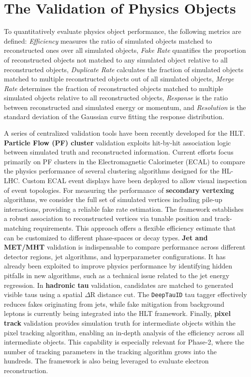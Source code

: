 \documentclass[a4paper,11pt]{article}
\begin{document}
\section{The Validation of Physics Objects}
\label{sec:valid}
To quantitatively evaluate physics object performance, the following metrics are defined:
\textit{Efficiency} measures the ratio of simulated objects matched to reconstructed ones over all simulated objects,
\textit{Fake Rate} quantifies the proportion of reconstructed objects not matched to any simulated object relative to all reconstructed objects,
\textit{Duplicate Rate} calculates the fraction of simulated objects matched to multiple reconstructed objects out of all simulated objects,
\textit{Merge Rate} determines the fraction of reconstructed objects matched to multiple simulated objects relative to all reconstructed objects,
\textit{Response} is the ratio between reconstructed and simulated energy or momentum, and
\textit{Resolution} is the standard deviation of the Gaussian curve fitting the response distribution. \par
%
A series of centralized validation tools have been recently developed for the HLT. 
\textbf{Particle Flow (PF) cluster} validation exploits hit-by-hit association logic between simulated truth and reconstructed information.
Current efforts focus primarily on PF clusters in the Electromagnetic Calorimeter (ECAL) to compare the physics performance of several clustering algorithms designed for the HL-LHC.
Custom ECAL event displays have been deployed to allow visual inspection of event topologies.
%
For measuring the performance of \textbf{secondary vertexing} algorithms, we consider the full set of simulated vertices including pile-up interactions, providing a reliable fake rate estimation.
The framework establishes a robust association to reconstructed vertices via tunable position and track-matching requirements.
This approach offers a flexible efficiency estimate that can be customized to different phase-spaces or decay types.
%
\textbf{Jet and MET/MHT} validation is indispensable to compare performance across different detector regions, jet algorithms, and hyperparameter configurations.
It has already been exploited to improve physics performance by identifying hidden pitfalls in new algorithms, such as a technical issue related to the jet energy regression.
%
In \textbf{hadronic tau} validation, candidates are matched to generated visible taus using a spatial $\Delta \text{R}$ distance cut.
The \texttt{DeepTauID} tau tagger effectively reduces fakes originating from jets, while fake mitigation from background leptons is currently being integrated into the HLT framework.
%
Finally, \textbf{pixel track} validation provides simulation truth for intermediate objects within the pixel tracking algorithm, enabling an in-depth analysis of the efficiency across all intermediate objects.
This capability is especially relevant for Phase-2, where the number of tracking parameters in the tracking algorithm grows into the hundreds.
The framework is also being leveraged to evaluate electron reconstruction.
%
\end{document}
